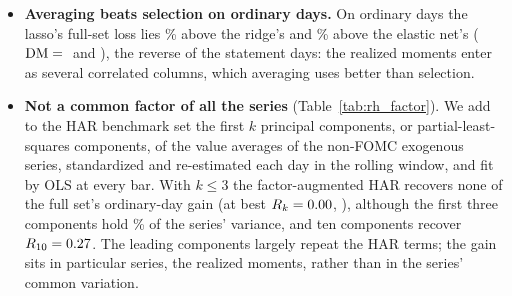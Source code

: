 \begin{itemize}
  be applied to the random forest, whose other removals were not run (its removal of the realized moments is on the
  design before the FOMC fix; Appendix~\ref{app:rh_channels}). The groups are largely correlated proxies of the
  volatility information that the futures' own moments measure most directly.
\item \textbf{Averaging beats selection on ordinary days.} On ordinary days the lasso's full-set loss lies
  \rhchLassoRidgeOrdPct\% above the ridge's and \rhchLassoEnetOrdPct\% above the elastic net's
  ($\mathrm{DM}={}$\rhchLassoRidgeOrdDm{} and \rhchLassoEnetOrdDm), the reverse of the statement days: the realized moments
  enter as several correlated columns, which averaging uses better than selection.
\item \textbf{Not a common factor of all the series} (Table~\ref{tab:rh_factor}). We add to the HAR benchmark set the
  first $k$ principal components, or partial-least-squares components, of the value averages of the \rhfaNSeries{}
  non-FOMC exogenous series, standardized and re-estimated each day in the rolling window, and fit by OLS at every bar.
  With $k \le 3$ the factor-augmented HAR recovers none of the full set's ordinary-day gain (at best
  $R_k = 0.00$, \rhfaBestSmall), although the first three components hold \rhfaShareCumThree\% of the
  series' variance, and ten components recover $R_{10} = 0.27$. The leading components largely repeat the
  HAR terms; the gain sits in particular series, the realized moments, rather than in the series' common variation.
\end{itemize}

